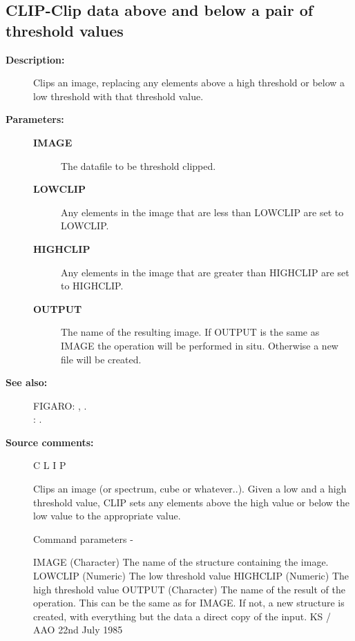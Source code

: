 \subsection{CLIP-\label{CLIP}Clip data above and below a pair of threshold values}
\begin{description}

\item [\textbf{Description:}]
 Clips an image, replacing any elements above a high threshold or
 below a low threshold with that threshold value.

\item [\textbf{Parameters:}]
\begin{description}
\item [\textbf{IMAGE}]
 The datafile to be threshold clipped.
\item [\textbf{LOWCLIP}]
 Any elements in the image that are less than LOWCLIP are
 set to LOWCLIP.
\item [\textbf{HIGHCLIP}]
 Any elements in the image that are greater than HIGHCLIP
 are set to HIGHCLIP.
\item [\textbf{OUTPUT}]
 The name of the resulting image.  If OUTPUT is the
 same as IMAGE the operation will be performed in situ.
 Otherwise a new file will be created.
\end{description}

\item [\textbf{See also:}]
FIGARO: , .\\
: .\\

\item [\textbf{Source comments:}]
\begin{terminalv}
 C L I P

 Clips an image (or spectrum, cube or whatever..).  Given a low
 and a high threshold value, CLIP sets any elements above the
 high value or below the low value to the appropriate value.

 Command parameters -

 IMAGE    (Character) The name of the structure containing the image.
 LOWCLIP  (Numeric) The low threshold value
 HIGHCLIP (Numeric) The high threshold value
 OUTPUT   (Character) The name of the result of the operation.  This
          can be the same as for IMAGE.  If not, a new structure
          is created, with everything but the data a direct
          copy of the input.
                                  KS / AAO 22nd July 1985
\end{terminalv}
\end{description}
